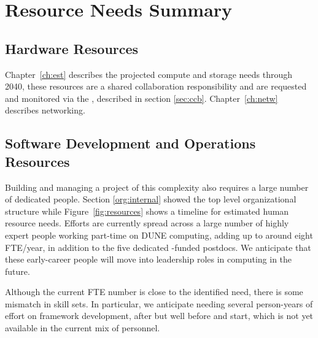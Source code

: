 \documentclass[../main-v1.tex]{subfiles}
\begin{document}
\chapter{Resource Needs Summary}
\label{ch:resource}

\section{Hardware Resources}
Chapter~\ref{ch:est} describes the projected compute and storage needs through 2040, these resources are a shared collaboration responsibility and are requested and monitored via the , described in section \ref{sec:ccb}. Chapter~\ref{ch:netw} describes networking. 



\section{%
Software Development and Operations Resources} %
Building and managing a project of this complexity also requires a large number of %
dedicated people. Section \ref{org:internal} showed the top level organizational structure while Figure~\ref{fig:resources} shows a timeline for estimated human resource needs.   Efforts are currently spread across a large number of highly expert people working part-time on DUNE computing, adding up to around eight FTE/year, in addition to  the five dedicated -funded postdocs.  We anticipate that these early-career people will move into leadership roles in computing in the future. 

Although the current FTE %
number is close to %
the identified need, there is some mismatch in skill sets. In particular, we anticipate needing several person-years of effort on framework development, after  but well before  and  start, which is not yet available in the current mix of personnel.
\end{document}
